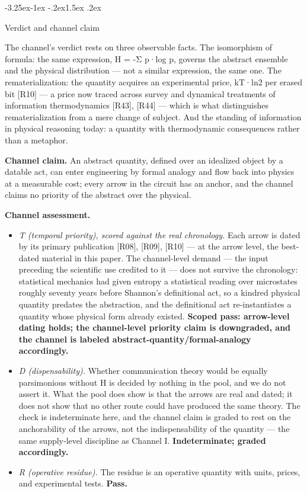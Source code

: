 \documentclass[11pt,a4paper]{article}
\makeatletter
\renewcommand\subsection{\@startsection{subsection}{2}{\z@}%
  {-3.25ex\@plus -1ex \@minus -.2ex}{1.5ex \@plus .2ex}%
  {\normalfont\large\bfseries\raggedright}}
\makeatother
\begin{document}
\subsection{Verdict and channel claim}

The channel's verdict rests on three observable facts. The isomorphism of formula: the same expression, H = -Σ p·log p, governs the abstract ensemble and the physical distribution — not a similar expression, the same one. The rematerialization: the quantity acquires an experimental price, kT·ln2 per erased bit [R10] — a price now traced across survey and dynamical treatments of information thermodynamics [R43], [R44] — which is what distinguishes rematerialization from a mere change of subject. And the standing of information in physical reasoning today: a quantity with thermodynamic consequences rather than a metaphor.

\textbf{Channel claim.} An abstract quantity, defined over an idealized object by a datable act, can enter engineering by formal analogy and flow back into physics at a measurable cost; every arrow in the circuit has an anchor, and the channel claims no priority of the abstract over the physical.

\textbf{Channel assessment.}

\begin{itemize}[leftmargin=1.6em,itemsep=2pt,parsep=0pt,topsep=3pt]
\item \textit{T (temporal priority), scored against the real chronology.} Each arrow is dated by its primary publication [R08], [R09], [R10] — at the arrow level, the best-dated material in this paper. The channel-level demand — the input preceding the scientific use credited to it — does not survive the chronology: statistical mechanics had given entropy a statistical reading over microstates roughly seventy years before Shannon's definitional act, so a kindred physical quantity predates the abstraction, and the definitional act re-instantiates a quantity whose physical form already existed. \textbf{Scoped pass: arrow-level dating holds; the channel-level priority claim is downgraded, and the channel is labeled abstract-quantity/formal-analogy accordingly.}
\item \textit{D (dispensability).} Whether communication theory would be equally parsimonious without H is decided by nothing in the pool, and we do not assert it. What the pool does show is that the arrows are real and dated; it does not show that no other route could have produced the same theory. The check is indeterminate here, and the channel claim is graded to rest on the anchorability of the arrows, not the indispensability of the quantity — the same supply-level discipline as Channel I. \textbf{Indeterminate; graded accordingly.}
\item \textit{R (operative residue).} The residue is an operative quantity with units, prices, and experimental tests. \textbf{Pass.}
\end{itemize}
\end{document}

